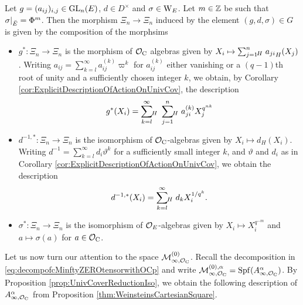 \documentclass[../main.tex]{subfiles}
\begin{document}
\begin{lem}\label{lem:ExplicitActionOnQthPowerRootSystems}
  Let $g = (a_{ij})_{i,j} \in \operatorname{GL}_n(E)$, $d \in D^\times$ and $\sigma \in
  \mathrm W_E$. Let $m \in \mathbb{Z}$ be such that $\sigma|_{{\breve {E}}} = \Phi^m$. Then the
  morphism $\Xi_n \to \Xi_n$ induced by the element $(g, d, \sigma) \in G$ is given by
  the composition of the morphsims
  \begin{itemize}
    \item $g^*\colon \Xi_n \to \Xi_n$ is the morphism of $\mathcal{O}_{\mathrm{C}}$ algebras given
      by $X_i \mapsto \sum_{j=1}^n {\hspace{-3pt}}_H\hspace{3pt} {a_{ji}}_H(X_j)$. Writing
      $a_{ij} = \sum_{k=l}^\infty a_{ij}^{(k)} \varpi^k$ for  $a_{ij}^{(k)}$
      either vanishing or a $(q-1)$th root of unity and a sufficiently chosen integer
      $k$, we obtain, by Corollary
      \ref{cor:ExplicitDescriptionOfActionOnUnivCov}, the description
      \begin{equation*}
        g^*(X_i) = \sum_{k=l}^\infty {\hspace{-3pt}}_H\hspace{3pt}
        \sum_{j=1}^n{\hspace{-3pt}}_H\hspace{3pt} a_{ji}^{(k)} X_j^{q^{nk}}
      \end{equation*}
      
    \item $d^{-1,*} \colon \Xi_n \to \Xi_n$ is the isomorphism of 
      $\mathcal{O}_{\mathrm{C}}$-algebras given by $X_i \mapsto d_H(X_i)$. 
      Writing $d^{-1} = \sum_{k=l}^\infty d_i \vartheta^k$ for
       a sufficiently small integer $k$, and $\vartheta$ and $d_i$ as in
       Corollary \ref{cor:ExplicitDescriptionOfActionOnUnivCov}, we obtain the
       description
      \begin{equation*}
        d^{-1, *}(X_i) =  \sum_{k=l}^\infty {\hspace{-3pt}}_H\hspace{3pt}
        d_k X_i^{1/q^k}.
      \end{equation*}

    \item $\sigma^*: \Xi_n \to \Xi_n$ is the isomorphism of 
      $\mathcal{O}_E$-algebras given by $X_i \mapsto X_i^{q^{-m}}$ and 
      $a \mapsto \sigma(a)$ for $a \in \mathcal{O}_{\mathrm{C}}$. 
  \end{itemize}
\end{lem}

Let us now turn our attention to the space $\mathcal{M}_{\infty,\mathcal{O}_{\mathrm{C}}}^{(0)}$. Recall
the decomposition in \eqref{eq:decompofcMinftyZEROtensorwithOCp} and write
$\mathcal{M}_{\infty, \mathcal{O}_{\mathrm{C}}}^{(0), \alpha} = \operatorname{Spf}(A^\alpha_{\infty, \mathcal{O}_{\mathrm{C}}})$. 
By Proposition \ref{prop:UnivCoverReductionIso},
we obtain the following description of $A_{\infty, \mathcal{O}_{\mathrm{C}}}^{\alpha}$ from
Proposition \ref{thm:WeinsteinsCartesianSquare}. 
\end{document}
